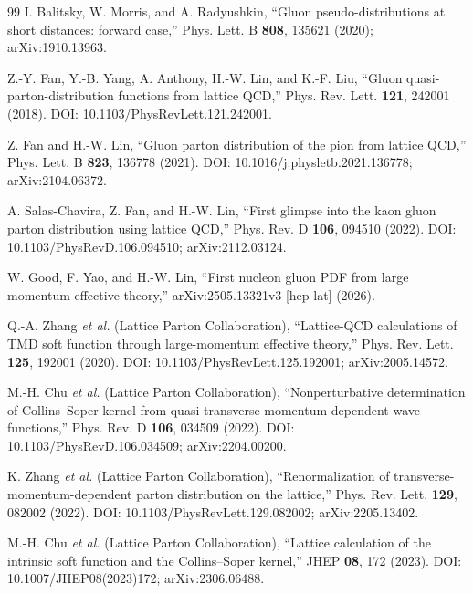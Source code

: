 \documentclass[UTF8,12pt,a4paper,twoside,openany]{ctexbook}
\begin{document}
\begin{thebibliography}{99}
I. Balitsky, W. Morris, and A. Radyushkin,
\newblock ``Gluon pseudo-distributions at short distances: forward case,''
\newblock Phys. Lett. B \textbf{808}, 135621 (2020); arXiv:1910.13963.

Z.-Y. Fan, Y.-B. Yang, A. Anthony, H.-W. Lin, and K.-F. Liu,
\newblock ``Gluon quasi-parton-distribution functions from lattice QCD,''
\newblock Phys. Rev. Lett. \textbf{121}, 242001 (2018).
\newblock DOI: 10.1103/PhysRevLett.121.242001.

Z. Fan and H.-W. Lin,
\newblock ``Gluon parton distribution of the pion from lattice QCD,''
\newblock Phys. Lett. B \textbf{823}, 136778 (2021).
\newblock DOI: 10.1016/j.physletb.2021.136778; arXiv:2104.06372.

A. Salas-Chavira, Z. Fan, and H.-W. Lin,
\newblock ``First glimpse into the kaon gluon parton distribution using lattice QCD,''
\newblock Phys. Rev. D \textbf{106}, 094510 (2022).
\newblock DOI: 10.1103/PhysRevD.106.094510; arXiv:2112.03124.

W. Good, F. Yao, and H.-W. Lin,
\newblock ``First nucleon gluon PDF from large momentum effective theory,''
\newblock arXiv:2505.13321v3 [hep-lat] (2026).

Q.-A. Zhang \textit{et al.} (Lattice Parton Collaboration),
\newblock ``Lattice-QCD calculations of TMD soft function through large-momentum effective theory,''
\newblock Phys. Rev. Lett. \textbf{125}, 192001 (2020).
\newblock DOI: 10.1103/PhysRevLett.125.192001; arXiv:2005.14572.

M.-H. Chu \textit{et al.} (Lattice Parton Collaboration),
\newblock ``Nonperturbative determination of Collins--Soper kernel from quasi transverse-momentum dependent wave functions,''
\newblock Phys. Rev. D \textbf{106}, 034509 (2022).
\newblock DOI: 10.1103/PhysRevD.106.034509; arXiv:2204.00200.

K. Zhang \textit{et al.} (Lattice Parton Collaboration),
\newblock ``Renormalization of transverse-momentum-dependent parton distribution on the lattice,''
\newblock Phys. Rev. Lett. \textbf{129}, 082002 (2022).
\newblock DOI: 10.1103/PhysRevLett.129.082002; arXiv:2205.13402.

M.-H. Chu \textit{et al.} (Lattice Parton Collaboration),
\newblock ``Lattice calculation of the intrinsic soft function and the Collins--Soper kernel,''
\newblock JHEP \textbf{08}, 172 (2023).
\newblock DOI: 10.1007/JHEP08(2023)172; arXiv:2306.06488.


\end{thebibliography}
\end{document}
